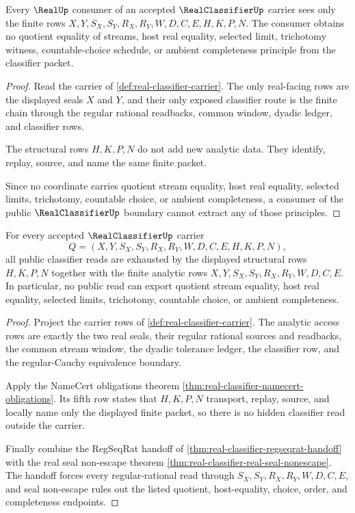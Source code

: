 \begin{theorem}
\label{thm:real-classifier-real-seal-nonescape}
Every $\RealUp$ consumer of an accepted $\RealClassifierUp$ carrier sees only the finite rows $X,Y,S_X,S_Y,R_X,R_Y,W,D,C,E,H,K,P,N$. The consumer obtains no quotient equality of streams, host real equality, selected limit, trichotomy witness, countable-choice schedule, or ambient completeness principle from the classifier packet.
\end{theorem}
\begin{proof}
Read the carrier of \autoref{def:real-classifier-carrier}. The only real-facing rows are the displayed seals $X$ and $Y$, and their only exposed classifier route is the finite chain through the regular rational readbacks, common window, dyadic ledger, and classifier rows.

The structural rows $H,K,P,N$ do not add new analytic data. They identify, replay, source, and name the same finite packet.

Since no coordinate carries quotient stream equality, host real equality, selected limits, trichotomy, countable choice, or ambient completeness, a consumer of the public $\RealClassifierUp$ boundary cannot extract any of those principles.
\end{proof}

\begin{theorem}
\label{thm:real-classifier-ledger-exhaustion}
For every accepted $\RealClassifierUp$ carrier
$$
Q=(X,Y,S_X,S_Y,R_X,R_Y,W,D,C,E,H,K,P,N),
$$
all public classifier reads are exhausted by the displayed structural rows $H,K,P,N$ together with the finite analytic rows $X,Y,S_X,S_Y,R_X,R_Y,W,D,C,E$. In particular, no public read can export quotient stream equality, host real equality, selected limits, trichotomy, countable choice, or ambient completeness.
\end{theorem}
\begin{proof}
Project the carrier rows of \autoref{def:real-classifier-carrier}. The analytic access rows are exactly the two real seals, their regular rational sources and readbacks, the common stream window, the dyadic tolerance ledger, the classifier row, and the regular-Cauchy equivalence boundary.

Apply the NameCert obligations theorem \autoref{thm:real-classifier-namecert-obligations}. Its fifth row states that $H,K,P,N$ transport, replay, source, and locally name only the displayed finite packet, so there is no hidden classifier read outside the carrier.

Finally combine the RegSeqRat handoff of \autoref{thm:real-classifier-regseqrat-handoff} with the real seal non-escape theorem \autoref{thm:real-classifier-real-seal-nonescape}. The handoff forces every regular-rational read through $S_X,S_Y,R_X,R_Y,W,D,C,E$, and seal non-escape rules out the listed quotient, host-equality, choice, order, and completeness endpoints.
\end{proof}

